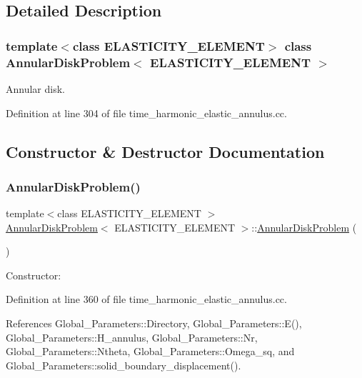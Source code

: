 \subsection{Detailed Description}
\subsubsection*{template$<$class E\+L\+A\+S\+T\+I\+C\+I\+T\+Y\+\_\+\+E\+L\+E\+M\+E\+NT$>$\newline
class Annular\+Disk\+Problem$<$ E\+L\+A\+S\+T\+I\+C\+I\+T\+Y\+\_\+\+E\+L\+E\+M\+E\+N\+T $>$}

Annular disk. 

Definition at line 304 of file time\+\_\+harmonic\+\_\+elastic\+\_\+annulus.\+cc.



\subsection{Constructor \& Destructor Documentation}
\mbox{\label{classAnnularDiskProblem_aad1ce56fa5c26045fb14d46acf29c89e}} 
\subsubsection{\texorpdfstring{Annular\+Disk\+Problem()}{AnnularDiskProblem()}}
{\footnotesize\ttfamily template$<$class E\+L\+A\+S\+T\+I\+C\+I\+T\+Y\+\_\+\+E\+L\+E\+M\+E\+NT $>$ \\
\hyperlink{classAnnularDiskProblem}{Annular\+Disk\+Problem}$<$ E\+L\+A\+S\+T\+I\+C\+I\+T\+Y\+\_\+\+E\+L\+E\+M\+E\+NT $>$\+::\hyperlink{classAnnularDiskProblem}{Annular\+Disk\+Problem} (\begin{DoxyParamCaption}{ }\end{DoxyParamCaption})}



Constructor\+: 



Definition at line 360 of file time\+\_\+harmonic\+\_\+elastic\+\_\+annulus.\+cc.



References Global\+\_\+\+Parameters\+::\+Directory, Global\+\_\+\+Parameters\+::\+E(), Global\+\_\+\+Parameters\+::\+H\+\_\+annulus, Global\+\_\+\+Parameters\+::\+Nr, Global\+\_\+\+Parameters\+::\+Ntheta, Global\+\_\+\+Parameters\+::\+Omega\+\_\+sq, and Global\+\_\+\+Parameters\+::solid\+\_\+boundary\+\_\+displacement().



